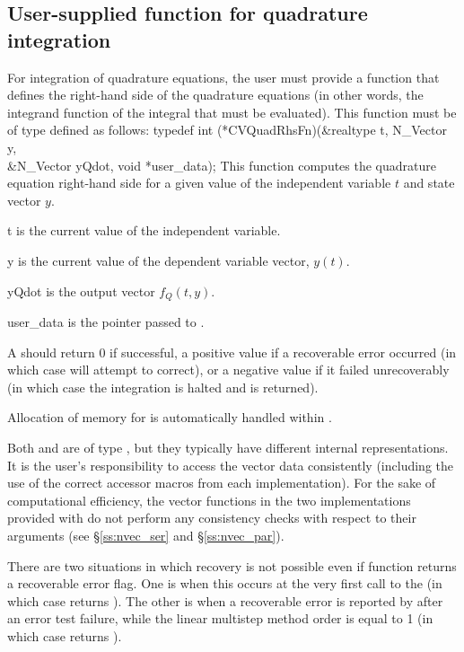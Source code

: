 
\subsection{User-supplied function for quadrature integration}
\label{ss:user_fct_quad}

For integration of quadrature equations, the user must provide a function
that defines the right-hand side of the quadrature equations (in other words,
the integrand function of the integral that must be evaluated). This function
must be of type  defined as follows:
{
  typedef int (*CVQuadRhsFn)(&realtype t, N\_Vector y, \\
                             &N\_Vector yQdot, void *user\_data);
}
{
  This function computes the quadrature equation right-hand side for a given value
  of the independent variable $t$ and state vector $y$.
}
{
  \begin{args}
  \item[t]
    is the current value of the independent variable.
  \item[y]
    is the current value of the dependent variable vector, $y(t)$.
  \item[yQdot]
    is the output vector $f_Q(t,y)$.
  \item[user\_data]
    is the  pointer passed to .
  \end{args}
}
{
  A  should return 0 if successful, a positive value if a recoverable
  error occurred (in which case {\cvodes} will attempt to correct), or a negative
  value if it failed unrecoverably (in which case the integration is halted and
   is returned).
}
{
  Allocation of memory for  is automatically handled within {\cvodes}.

  Both  and  are of type ,
  but they  typically have different internal representations. It is the user's
  responsibility to access the vector data consistently (including the use of the
  correct accessor macros from each {\nvector} implementation). For the sake of
  computational efficiency, the vector functions in the two {\nvector} implementations
  provided with {\cvodes} do not perform any consistency checks with respect to their
   arguments (see \S\ref{ss:nvec_ser} and \S\ref{ss:nvec_par}).

  There are two situations in which recovery is not possible even if 
  function returns a recoverable error flag.  One is when this occurs at the
  very first call to the  (in which case {\cvodes} returns
  ).  The other is when a recoverable error is reported
  by  after an error test failure, while the linear multistep method
  order is equal to 1 (in which case {\cvodes} returns ).
}



